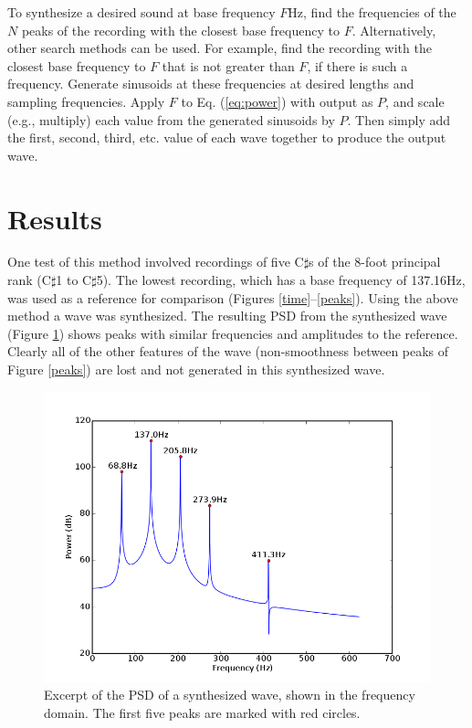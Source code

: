 \documentclass[twocolumn]{article}
\begin{document}
To synthesize a desired sound at base frequency $F$Hz, find the frequencies of the $N$ peaks of the recording with the closest base frequency to $F$. Alternatively, other search methods can be used. For example, find the recording with the closest base frequency to $F$ that is not greater than $F$, if there is such a frequency. Generate sinusoids at these frequencies at desired lengths and sampling frequencies. Apply $F$ to Eq. (\ref{eq:power}) with output as $P$, and scale (e.g., multiply) each value from the generated sinusoids by $P$. Then simply add the first, second, third, etc. value of each wave together to produce the output wave.

\section{Results}

One test of this method involved recordings of five C$\sharp$s of the 8-foot principal rank (C$\sharp$1 to C$\sharp$5). The lowest recording, which has a base frequency of 137.16Hz, was used as a reference for comparison (Figures \ref{time}--\ref{peaks}). Using the above method a wave was synthesized. The resulting PSD from the synthesized wave (Figure \ref{synth-peaks}) shows peaks with similar frequencies and amplitudes to the reference. Clearly all of the other features of the wave (non-smoothness between peaks of Figure \ref{peaks}) are lost and not generated in this synthesized wave.

\begin{figure}
\centering
\includegraphics[width=\linewidth]{figures/synth-peaks.png}
\caption{Excerpt of the PSD of a synthesized wave, shown in the frequency domain. The first five peaks are marked with red circles.}
\label{synth-peaks}
\end{figure}
\end{document}
